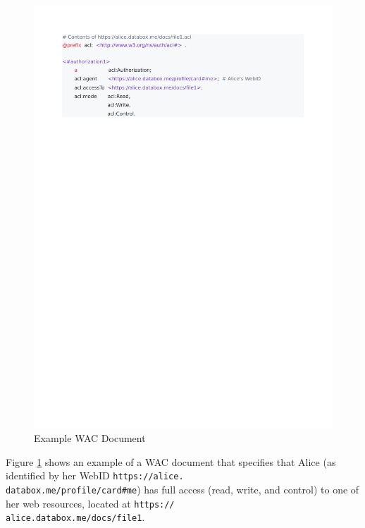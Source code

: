 \documentclass[sigconf]{acmart}
\def\code#1{\texttt{#1}}
\begin{document}
\begin{figure}
  \includegraphics[trim=2cm 21.9cm 4.7cm 2cm, clip, scale=0.57]{pdf/alice-permission}
  \caption{Example WAC Document}
  \label{fig:individual-permission}
\end{figure}

Figure \ref{fig:individual-permission} shows an example of a WAC document that specifies that Alice (as identified by her WebID \code{https://alice.\\databox.me/profile/card\#me}) has full access (read, write, and control) to one of her web resources, located at \code{https://\\alice.databox.me/docs/file1}.
\end{document}
